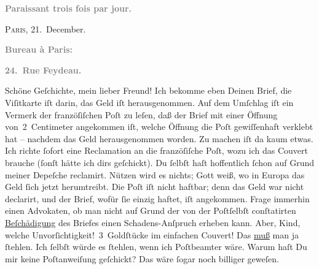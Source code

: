 \pstart
           \begin{otherlanguage}{french}\textcolor{gray}{\textbf{\textbf{Paraissant trois fois par jour.}}}\end{otherlanguage}\hfill \textsc{Paris}, 21. December.\pend
           
\pstart
           \begin{otherlanguage}{french}\textcolor{gray}{\textbf{\textbf{Bureau à Paris:}}}\end{otherlanguage}\pend
           
\pstart
           \begin{otherlanguage}{french}\textcolor{gray}{\textbf{\textbf{24. Rue Feydeau.}}}\end{otherlanguage}\pend
           \vspace{0.5em}{\vspace{1\baselineskip}}
\pstart
           Schöne Geſchichte, mein lieber Freund! Ich bekomme
               eben Deinen Brief, die Viſitkarte iſt darin, das Geld iſt herausgenommen. Auf dem
               Umſchlag iſt ein Vermerk der franzöſiſchen Poſt
               zu leſen, daß der Brief mit einer Öffnung von 2 Centimeter angekommen iſt, welche
               Öffnung die Poſt gewiſſenhaft  verklebt hat – nachdem das Geld herausgenommen
               worden. Zu machen iſt da kaum etwas. Ich richte{ }ſofort eine Reclamation an die franzöſiſche Poſt, wozu ich das Couvert brauche
               (ſonſt hätte ich dirs geſchickt). {\pb}Du{ }ſelbſt haſt
               hoffentlich{ }ſchon auf Grund meiner Depeſche reclamirt. Nützen wird es nichts; Gott
               weiß, wo in Europa das Geld{ }ſich jetzt
               herumtreibt. Die Poſt iſt nicht haftbar; denn das
               Geld war nicht declarirt, und der Brief, wofür{ }ſie einzig haftet, iſt angekommen.
               Frage immerhin einen Advokaten, ob man nicht auf Grund der von der Poſtſelbſt conſtatirten \uline{Beſchädigung} des Briefes einen Schadens-Anſpruch erheben kann. {\pb}Aber, Kind, welche Unvorſichtigkeit! 3 Goldſtücke im
               einfachen Couvert! Das \uline{muß} man ja{ }ſtehlen. Ich{ }ſelbſt
               würde es{ }ſtehlen, wenn ich Poſtbeamter wäre. Warum haſt Du mir keine Poſtanweiſung
               geſchickt? Das wäre{ }ſogar noch billiger geweſen.\pend
           
